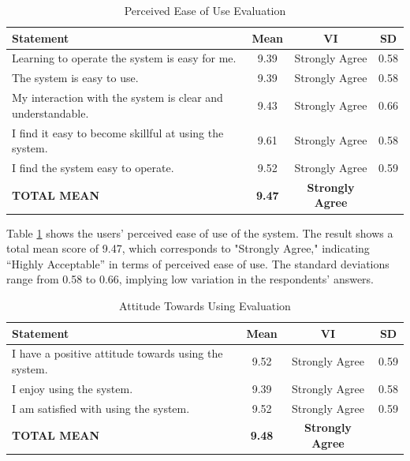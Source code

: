 \documentclass[12pt,a4paper,]{article}
\begin{document}
	\begin{table}[h!]
		\centering
		\caption{Perceived Ease of Use Evaluation}
		\label{percease}
		\renewcommand{\arraystretch}{1.2}
		\begin{tabularx}{\linewidth}{|X|c|c|c|}
			\hline
			\textbf{Statement} & \textbf{Mean} & \textbf{VI} & \textbf{SD} \\ \hline
			Learning to operate the system is easy for me.
			& 9.39 & Strongly Agree & 0.58 \\ \hline
			The system is easy to use.
			& 9.39 & Strongly Agree & 0.58 \\ \hline
			My interaction with the system is clear and understandable.
			& 9.43 & Strongly Agree & 0.66 \\ \hline
			I find it easy to become skillful at using the system.
			& 9.61 & Strongly Agree & 0.58 \\ \hline
			I find the system easy to operate.
			& 9.52 & Strongly Agree & 0.59 \\ \hline
			\textbf{TOTAL MEAN} & \textbf{9.47} & \textbf{Strongly Agree} & \\ \hline
		\end{tabularx}
	\end{table}
	
	Table \ref{percease} shows the users’ perceived ease of use of the system. The result shows a total mean score of 9.47, which corresponds to "Strongly Agree," indicating “Highly Acceptable” in terms of perceived ease of use. The standard deviations range from 0.58 to 0.66, implying low variation in the respondents’ answers.
	
	\begin{table}[h!]
		\centering
		\caption{Attitude Towards Using Evaluation}
		\label{attuse}
		\renewcommand{\arraystretch}{1.2}
		\begin{tabularx}{\linewidth}{|X|c|c|c|}
			\hline
			\textbf{Statement} & \textbf{Mean} & \textbf{VI} & \textbf{SD} \\ \hline
			I have a positive attitude towards using the system.
			& 9.52 & Strongly Agree & 0.59 \\ \hline
			I enjoy using the system.
			& 9.39 & Strongly Agree & 0.58 \\ \hline
			I am satisfied with using the system.
			& 9.52 & Strongly Agree & 0.59 \\ \hline
			\textbf{TOTAL MEAN} & \textbf{9.48} & \textbf{Strongly Agree} & \\ \hline
		\end{tabularx}
	\end{table}
	
\end{document}
